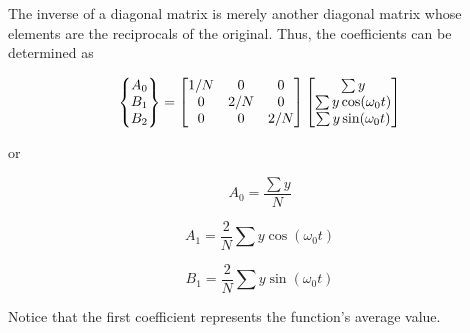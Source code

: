 \documentclass[../main.tex]{subfiles}
\begin{document}
\noindent The inverse of a diagonal matrix is merely another diagonal matrix whose elements are the
reciprocals of the original. Thus, the coefficients can be determined as

\begin{equation}
	\notag
	\begin{Bmatrix}
		A_0 \\ B_1 \\ B_2
	\end{Bmatrix}
	=
	\begin{bmatrix}
		1/N & 0 & 0 \\
		0 & 2/N & 0 \\
		0 & 0 & 2/N
	\end{bmatrix}
	\begin{bmatrix}
		\sum y \\
		\sum y \cos(\omega_0 t) \\
		\sum y \sin(\omega_0 t)
	\end{bmatrix}
\end{equation}

\noindent or

\begin{equation}
	\tag{16.14}
	A_0 = \frac{\sum y}{N}
\end{equation}

\begin{equation}
	\tag{16.15}
	A_1 =\frac{2}{N} \sum y \cos(\omega_0 t)
\end{equation}

\begin{equation}
	\tag{16.16}
	B_1 = \frac{2}{N} \sum y \sin(\omega_0 t)
\end{equation}

\noindent Notice that the first coefficient represents the function's average value.
\end{document}
